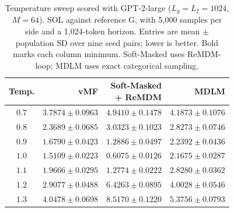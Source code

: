 \begin{table}
  \centering
  \footnotesize
  \setlength{\tabcolsep}{2.5pt}
  \renewcommand{\arraystretch}{1.12}
  \begin{tabular}{@{}crrr@{}}
    \toprule
    Temp. & vMF & \shortstack{Soft-Masked\\+ ReMDM} & MDLM \\
    \midrule
    $0.7$ & $3.7874 \pm 0.0963$ & $4.9410 \pm 0.1478$ & $4.1873 \pm 0.1076$ \\
    $0.8$ & $2.3689 \pm 0.0685$ & $3.0323 \pm 0.1023$ & $2.8273 \pm 0.0746$ \\
    $0.9$ & $1.6790 \pm 0.0423$ & $1.2886 \pm 0.0497$ & $2.2392 \pm 0.0436$ \\
    $1.0$ & $\mathbf{1.5109 \pm 0.0223}$ & $\mathbf{0.6075 \pm 0.0126}$ & $\mathbf{2.1675 \pm 0.0287}$ \\
    $1.1$ & $1.9666 \pm 0.0295$ & $1.2774 \pm 0.0222$ & $2.8280 \pm 0.0362$ \\
    $1.2$ & $2.9077 \pm 0.0488$ & $6.4263 \pm 0.0895$ & $4.0028 \pm 0.0546$ \\
    $1.3$ & $4.0478 \pm 0.0698$ & $8.5170 \pm 0.1220$ & $5.3756 \pm 0.0793$ \\
    \bottomrule
  \end{tabular}
  \caption{\footnotesize Temperature sweep scored with GPT-2-large ($L_g=L_\xi=1024$, $M=64$).
  SOL against reference G, with 5,000 samples per side and a 1,024-token horizon.
  Entries are mean $\pm$ population SD over nine seed pairs; lower is better.
  Bold marks each column minimum. Soft-Masked uses ReMDM-loop;
  MDLM uses exact categorical sampling.}
  \label{tab:owt-temperature-gpt1k}
\end{table}
